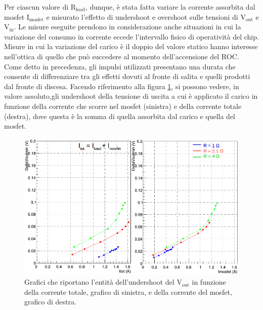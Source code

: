 Per ciascun valore di $\mathrm{R_{load}}$, dunque, è stata fatta variare la corrente assorbita dal mosfet $\mathrm{I_{mosfet}}$ e misurato l'effetto di undershoot e overshoot sulle tensioni di $\mathrm{V_{out}}$ e $\mathrm{V_{in}}$. 
Le misure eseguite prendono in considerazione anche situazioni in cui la variazione del consumo in corrente eccede l'intervallo fisico di operatività del chip. Misure in cui la variazione del carico è il doppio del valore statico hanno interesse nell'ottica di quello che può succedere al momento dell'accensione del ROC. %
Come detto in precedenza, gli impulsi utilizzati presentano una durata che consente di differenziare tra gli effetti dovuti al fronte di salita e quelli prodotti dal fronte di discesa. 
Facendo riferimento alla figura \ref{VoutUnd}, si possono vedere, in valore assoluto,gli undershoot della tensione di uscita a cui è applicato il carico in funzione della corrente che scorre nel mosfet (sinistra) e della corrente totale (destra), dove questa è la somma di quella assorbita dal carico e quella del mosfet. 
\begin{figure}
\centering
\includegraphics[width=0.9\linewidth]{Immagini/VoutUnd}
\caption{Grafici che riportano l'entità dell'undershoot del $\mathrm{V_{out}}$ in funzione della corrente totale, grafico di sinistra, e della corrente del mosfet, grafico di destra.}
\label{VoutUnd}
\end{figure}
